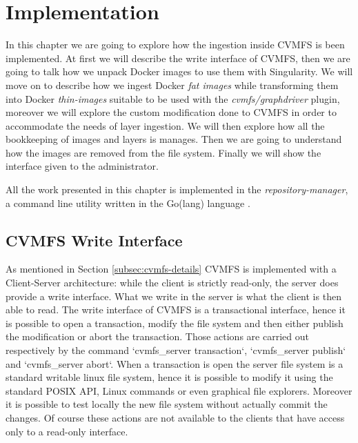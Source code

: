 \chapter{Implementation}\label{ch:Implementation}

In this chapter we are going to explore how the ingestion inside CVMFS is been
implemented. At first we will describe the write interface of CVMFS, then we
are going to talk how we unpack Docker images to use them with Singularity. We
will move on to describe how we ingest Docker \textit{fat images} while
transforming them into Docker \textit{thin-images} suitable to be used with the
\textit{cvmfs/graphdriver} plugin, moreover we will explore the custom
modification done to CVMFS in order to accommodate the needs of layer
ingestion. We will then explore how all the bookkeeping of images and layers is
manages.  Then we are going to understand how the images are removed from the
file system. Finally we will show the interface given to the administrator.

All the work presented in this chapter is implemented in the
\textit{repository-manager}, a command line utility written in the Go(lang)
language \cite{repository-manager}.

\section{CVMFS Write Interface}

As mentioned in Section \ref{subsec:cvmfs-details} CVMFS is implemented with a
Client-Server architecture: while the client is strictly read-only, the server
does provide a write interface. What we write in the server is what the client
is then able to read.  The write interface of CVMFS is a transactional
interface, hence it is possible to open a transaction, modify the file system and
then either publish the modification or abort the transaction. Those actions
are carried out respectively by the command `cvmfs\_server transaction`,
`cvmfs\_server publish` and `cvmfs\_server abort`.  When a transaction is open
the server file system is a standard writable linux file system, hence it is
possible to modify it using the standard POSIX API, Linux commands or even
graphical file explorers.  Moreover it is possible to test locally the new file
system without actually commit the changes. Of course these actions are not
available to the clients that have access only to a read-only interface. 

